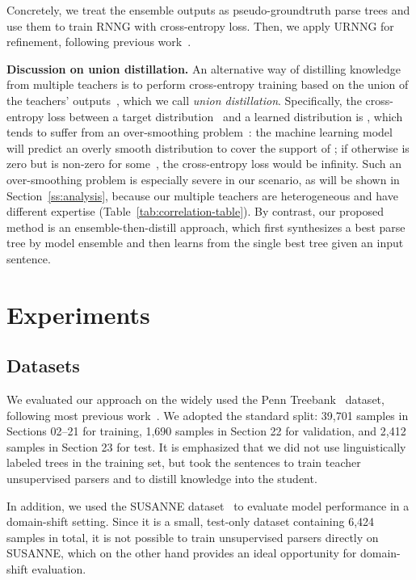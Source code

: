 \documentclass{article}
\begin{document}
Concretely, we treat the ensemble outputs as pseudo-groundtruth parse trees and use them to train RNNG with cross-entropy loss. Then, we apply URNNG for refinement, following previous work~\citep{kim-etal-2019-compound,cao-etal-2020-unsupervised}.

\textbf{Discussion on union distillation.}
\label{discussion:uniondistill}
An alternative way of distilling knowledge from multiple teachers is to perform cross-entropy training based on the union of the teachers' outputs~\citep{wu-etal-2021-one}, which we call \textit{union distillation}. Specifically, the cross-entropy loss between a target distribution~ and a learned distribution  is , which tends to suffer from  an over-smoothing problem~\citep{WeiDialogGenerateShort,wen2022equal,wen-etal-2023-f}: the machine learning model will predict an overly smooth distribution  to cover the support of ; if otherwise  is zero but  is non-zero for some~, the cross-entropy loss would be infinity. Such an over-smoothing problem is especially severe in our scenario, as will be shown in Section~\ref{ss:analysis}, because our multiple teachers are heterogeneous and have different expertise (Table~\ref{tab:correlation-table}). By contrast, our proposed method is an ensemble-then-distill approach, which first synthesizes a best parse tree by model ensemble and then learns from the single best tree given an input sentence.


\section{Experiments}

\subsection{Datasets}

We evaluated our approach on the widely used the Penn Treebank~\citep[PTB;][]{marcus-etal-1993-building} dataset, following most previous work~\citep{shen2018ordered,kim-etal-2019-compound,cao-etal-2020-unsupervised,maveli-cohen-2022-co,li-lu-2023-contextual}. We adopted the standard split: 39,701 samples in Sections 02--21 for training, 1,690 samples in Section 22 for validation, and 2,412 samples in Section 23 for test. It is emphasized that we did not use linguistically labeled trees in the training set, but took the sentences to train teacher unsupervised parsers and to distill knowledge into the student.

In addition, we used the SUSANNE dataset~\citep{SusanneCorpus} to evaluate model performance in a domain-shift setting. Since it is a small, test-only dataset containing 6,424 samples in total, it is not possible to train unsupervised parsers directly on SUSANNE, which on the other hand provides an ideal opportunity for domain-shift evaluation.
\end{document}

